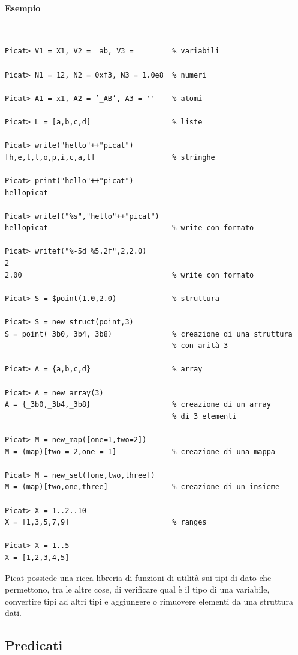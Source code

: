 \documentclass[12pt,a4paper,openright]{book} %
\begin{document}
\paragraph{Esempio}\
\begin{verbatim}
Picat> V1 = X1, V2 = _ab, V3 = _       % variabili

Picat> N1 = 12, N2 = 0xf3, N3 = 1.0e8  % numeri

Picat> A1 = x1, A2 = ’_AB’, A3 = ''    % atomi

Picat> L = [a,b,c,d]                   % liste

Picat> write("hello"++"picat")
[h,e,l,l,o,p,i,c,a,t]                  % stringhe

Picat> print("hello"++"picat")
hellopicat

Picat> writef("%s","hello"++"picat")
hellopicat                             % write con formato

Picat> writef("%-5d %5.2f",2,2.0)
2
2.00                                   % write con formato

Picat> S = $point(1.0,2.0)             % struttura

Picat> S = new_struct(point,3)
S = point(_3b0,_3b4,_3b8)              % creazione di una struttura
                                       % con arità 3

Picat> A = {a,b,c,d}                   % array

Picat> A = new_array(3)
A = {_3b0,_3b4,_3b8}                   % creazione di un array 
                                       % di 3 elementi

Picat> M = new_map([one=1,two=2])
M = (map)[two = 2,one = 1]             % creazione di una mappa

Picat> M = new_set([one,two,three])
M = (map)[two,one,three]               % creazione di un insieme

Picat> X = 1..2..10
X = [1,3,5,7,9]                        % ranges

Picat> X = 1..5
X = [1,2,3,4,5]
\end{verbatim}

Picat possiede una ricca libreria di funzioni di utilità sui tipi di
dato che permettono, tra le altre cose, di verificare qual è il tipo
di una variabile, convertire tipi ad altri tipi e aggiungere o
rimuovere elementi da una struttura dati.

\subsection{Predicati}
\label{subsec:picat_base_pred}
\end{document}
